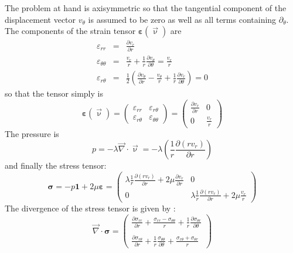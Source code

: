 The problem at hand is axisymmetric so that the tangential component of the displacement
vector $v_\theta$ is assumed to be zero as well as all terms containing $\partial_\theta$.
The components of the strain tensor ${\bm\varepsilon}(\vec\upnu)$ are 
\begin{eqnarray}
\varepsilon_{rr} &=& \frac{\partial v_r}{\partial r} \\
\varepsilon_{\theta\theta} &=& \frac{v_r}{r} + \frac{1}{r} \frac{\partial v_\theta}{\partial \theta}
= \frac{v_r}{r} 
 \\
\varepsilon_{r\theta} &=& \frac{1}{2} \left(   \frac{\partial v_\theta}{\partial r} - \frac{v_\theta}{r} 
+\frac{1}{r} \frac{\partial v_r}{\partial \theta}  \right) =0
\end{eqnarray}
so that the tensor simply is
\begin{equation}
{\bm \varepsilon}(\vec\upnu) =
\left(
\begin{array}{cc}
\varepsilon_{rr} & \varepsilon_{r\theta} \\ 
\varepsilon_{r\theta} & \varepsilon_{\theta\theta} 
\end{array}
\right)
=
\left(
\begin{array}{cc}
\frac{\partial v_r}{\partial r} & 0 \\
0 &  \frac{v_r}{r} 
\end{array}
\right)
\end{equation}
The pressure is
\begin{equation}
p=-\lambda {\vec \nabla}\cdot {\vec\upnu}
= -\lambda \left( \frac{1}{r} \frac{\partial (r v_r)}{\partial r} \right)
\end{equation}
and finally the stress tensor:
\begin{equation}
{\bm \sigma} 
= - p {\bm 1} + 2\mu {\bm \varepsilon}
=  
\left(
\begin{array}{cc}
\lambda \frac{1}{r} \frac{\partial (r v_r)}{\partial r} + 2\mu\frac{\partial v_r}{\partial r} & 0 \\
0 & \lambda \frac{1}{r} \frac{\partial (r v_r)}{\partial r}  +  2 \mu\frac{v_r}{r} 
\end{array}
\right)
\end{equation}
The divergence of the stress tensor is given by \cite{scto01}:
\begin{equation}
{\vec \nabla}\cdot {\bm \sigma} 
=
\left(
\begin{array}{c}
\frac{\partial \sigma_{rr}}{\partial r} + \frac{\sigma_{rr}-\sigma_{\theta\theta}}{r} + \frac{1}{r} \frac{\partial \sigma_{\theta r}}{\partial \theta} \\ \\
\frac{\partial \sigma_{r \theta}}{\partial r} + \frac{1}{r} \frac{\sigma_{\theta\theta}}{\partial \theta}
+\frac{\sigma_{r\theta} + \sigma_{\theta r}}{r}
\end{array}
\right)
\end{equation}
